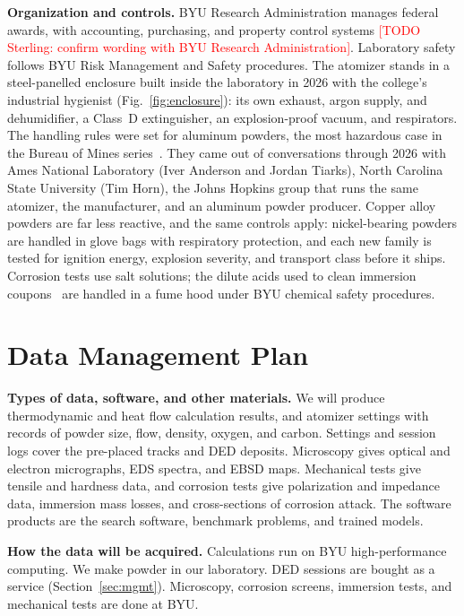 \documentclass[12pt,letterpaper]{article}
\newcommand{\todo}[1]{\textcolor{red}{[TODO Sterling: #1]}}
\begin{document}
\textbf{Organization and controls.} BYU Research Administration manages
federal awards, with accounting, purchasing, and property control systems
\todo{confirm wording with BYU Research Administration}. Laboratory safety
follows BYU Risk Management and Safety procedures.
The atomizer stands in a steel-panelled enclosure built inside the laboratory in 2026 with the college's industrial hygienist (Fig.~\ref{fig:enclosure}): its own exhaust, argon supply, and dehumidifier, a Class~D extinguisher, an explosion-proof vacuum, and respirators.
The handling rules were set for aluminum powders, the most hazardous case in the Bureau of Mines series~\cite{jacobson1964}.
They came out of conversations through 2026 with Ames National Laboratory (Iver Anderson and Jordan Tiarks), North Carolina State University (Tim Horn), the Johns Hopkins group that runs the same atomizer, the manufacturer, and an aluminum powder producer.
Copper alloy powders are far less reactive, and the same controls apply: nickel-bearing powders are handled in glove bags with respiratory protection, and each new family is tested for ignition energy, explosion severity, and transport class before it ships.
Corrosion tests use salt solutions; the dilute acids used to clean immersion
coupons~\cite{astmG1} are handled in a fume hood under BYU chemical safety
procedures.

\clearpage
\setcounter{page}{1}
\renewcommand{\thepage}{D-\arabic{page}}
\section{Data Management Plan}
\label{sec:dmp}

\textbf{Types of data, software, and other materials.} We will produce
thermodynamic and heat flow calculation results, and atomizer settings with
records of powder size, flow, density, oxygen, and carbon. Settings and
session logs cover the pre-placed tracks and DED deposits. Microscopy gives
optical and electron micrographs, EDS spectra, and EBSD maps. Mechanical
tests give tensile and hardness data, and corrosion tests give polarization
and impedance data, immersion mass losses, and cross-sections of corrosion
attack. The software products are the search software, benchmark problems,
and trained models.

\textbf{How the data will be acquired.} Calculations run on BYU
high-performance computing. We make powder in our laboratory. DED
sessions are bought as a service (Section~\ref{sec:mgmt}). Microscopy,
corrosion screens, immersion tests, and mechanical tests are done at BYU.
\end{document}
